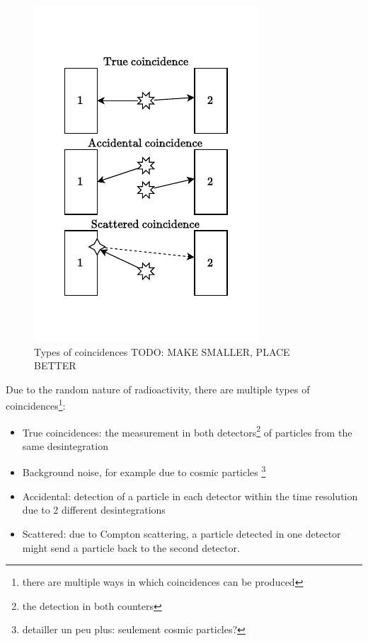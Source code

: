 \begin{figure}
    \includegraphics[width=\linewidth, trim={0 1cm 0 1.2cm}, clip]{figures/coincidence_types.pdf}
    \caption{Types of coincidences TODO: MAKE SMALLER, PLACE BETTER}
\end{figure}
Due to the random nature of radioactivity, there are multiple types of coincidences\footnote{there are multiple ways in which coincidences can be produced}:
\begin{itemize}
    \item True coincidences: the measurement in both detectors\footnote{the detection in both counters} of particles from the same desintegration
    \item Background noise, for example due to cosmic particles \footnote{detailler un peu plus: seulement cosmic particles?}
    \item Accidental: detection of a particle in each detector within the time resolution due to 2 different desintegrations
    \item Scattered: due to Compton scattering, a particle detected in one detector might send a particle back to the second detector.
\end{itemize}

